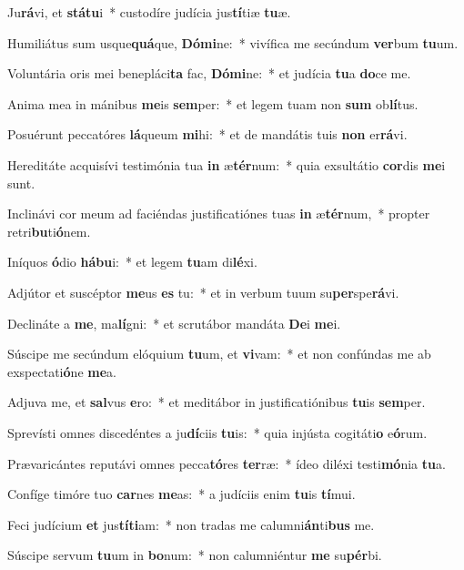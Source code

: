 \item Ju\textbf{rá}vi, et \textbf{stá}\textbf{tu}i~* custodíre judícia jus\textbf{tí}tiæ \textbf{tu}æ.
\item Humiliátus sum usque\textbf{quá}que, \textbf{Dó}\textbf{mi}ne:~* vivífica me secúndum \textbf{ver}bum \textbf{tu}um.
\item Voluntária oris mei benepláci\textbf{ta} fac, \textbf{Dó}\textbf{mi}ne:~* et judícia \textbf{tu}a \textbf{do}ce me.
\item Anima mea in mánibus \textbf{me}is \textbf{sem}per:~* et legem tuam non \textbf{sum} ob\textbf{lí}tus.
\item Posuérunt peccatóres \textbf{lá}queum \textbf{mi}hi:~* et de mandátis tuis \textbf{non} er\textbf{rá}vi.
\item Hereditáte acquisívi testimónia tua \textbf{in} æ\textbf{tér}num:~* quia exsultátio \textbf{cor}dis \textbf{me}i sunt.
\item Inclinávi cor meum ad faciéndas justificatiónes tuas \textbf{in} æ\textbf{tér}num,~* propter retri\textbf{bu}ti\textbf{ó}nem.
\item Iníquos \textbf{ó}dio \textbf{há}\textbf{bu}i:~* et legem \textbf{tu}am di\textbf{lé}xi.
\item Adjútor et suscéptor \textbf{me}us \textbf{es} tu:~* et in verbum tuum su\textbf{per}spe\textbf{rá}vi.
\item Declináte a \textbf{me}, ma\textbf{lí}gni:~* et scrutábor mandáta \textbf{De}i \textbf{me}i.
\item Súscipe me secúndum elóquium \textbf{tu}um, et \textbf{vi}vam:~* et non confúndas me ab exspectati\textbf{ó}ne \textbf{me}a.
\item Adjuva me, et \textbf{sal}vus \textbf{e}ro:~* et meditábor in justificatiónibus \textbf{tu}is \textbf{sem}per.
\item Sprevísti omnes discedéntes a ju\textbf{dí}ciis \textbf{tu}is:~* quia injústa cogitáti\textbf{o} e\textbf{ó}rum.
\item Prævaricántes reputávi omnes pecca\textbf{tó}res \textbf{ter}ræ:~* ídeo diléxi testi\textbf{mó}nia \textbf{tu}a.
\item Confíge timóre tuo \textbf{car}nes \textbf{me}as:~* a judíciis enim \textbf{tu}is \textbf{tí}mui.
\item Feci judícium \textbf{et} jus\textbf{tí}\textbf{ti}am:~* non tradas me calumni\textbf{án}ti\textbf{bus} me.
\item Súscipe servum \textbf{tu}um in \textbf{bo}num:~* non calumniéntur \textbf{me} su\textbf{pér}bi.
